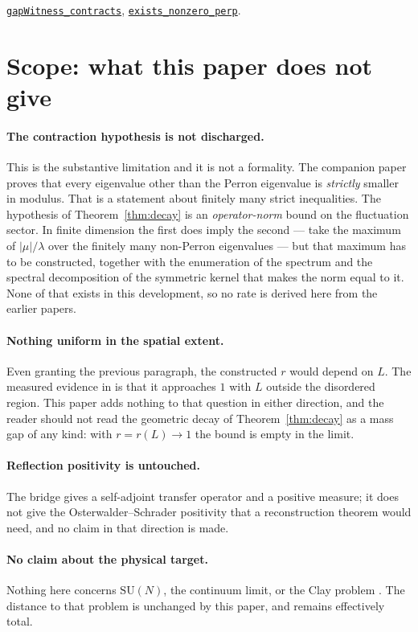 \documentclass[11pt]{article}
\theoremstyle{definition}
\newcommand{\anchor}{c4fa6a9e6769496a7270981ef0908b2d644c230b}
\newcommand{\osline}[3]{%
  \href{https://github.com/lluiseriksson/THE-ERIKSSON-PROGRAMME/blob/\anchor/YangMills/OS/#1.lean\#L#2}{\nolinkurl{#3}}}
\newcommand{\SU}{\mathrm{SU}}
\begin{document}
\osline{SpatialGibbs}{480}{gapWitness\_contracts},
\osline{SpatialGibbs}{492}{exists\_nonzero\_perp}.

\section{Scope: what this paper does not give}\label{sec:scope}

\paragraph{The contraction hypothesis is not discharged.}  This is the
substantive limitation and it is not a formality.  The companion
paper \cite{ErikssonGap} proves that every eigenvalue other than the Perron
eigenvalue is \emph{strictly} smaller in modulus.  That is a statement about
finitely many strict inequalities.  The hypothesis of Theorem~\ref{thm:decay}
is an \emph{operator-norm} bound on the fluctuation sector.  In finite
dimension the first does imply the second --- take the maximum of
$|\mu|/\lambda$ over the finitely many non-Perron eigenvalues --- but that
maximum has to be constructed, together with the enumeration of the spectrum
and the spectral decomposition of the symmetric kernel that makes the norm
equal to it.  None of that exists in this development, so no rate is derived
here from the earlier papers.

\paragraph{Nothing uniform in the spatial extent.}  Even granting the previous
paragraph, the constructed $r$ would depend on $L$.  The measured evidence
in \cite{ErikssonGap} is that it approaches $1$ with $L$ outside the disordered
region.  This paper adds nothing to that question in either direction, and the
reader should not read the geometric decay of Theorem~\ref{thm:decay} as a
mass gap of any kind: with $r=r(L)\to1$ the bound is empty in the limit.

\paragraph{Reflection positivity is untouched.}  The bridge gives a
self-adjoint transfer operator and a positive measure; it does not give the
Osterwalder--Schrader positivity that a reconstruction theorem would need, and
no claim in that direction is made.

\paragraph{No claim about the physical target.}  Nothing here concerns
$\SU(N)$, the continuum limit, or the Clay problem \cite{Clay}.  The distance
to that problem is unchanged by this paper, and remains effectively total.
\end{document}
